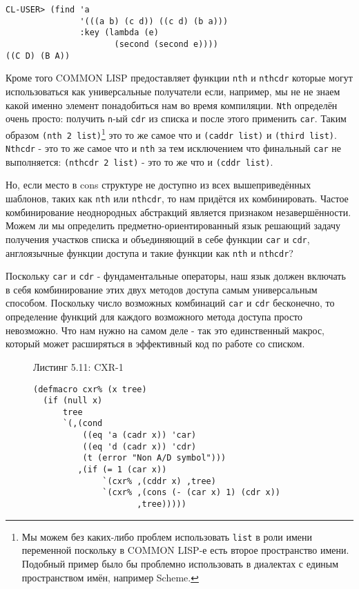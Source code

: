 \begin{verbatim}
CL-USER> (find 'a
               '(((a b) (c d)) ((c d) (b a)))
               :key (lambda (e)
                      (second (second e))))
((C D) (B A))
\end{verbatim}

Кроме того COMMON LISP предоставляет функции \verb"nth" и \verb"nthcdr" которые могут использоваться как универсальные получатели если, например, мы не не знаем какой именно элемент понадобиться нам во время компиляции. \verb"Nth" определён очень просто: получить \verb"n"-ый \verb"cdr" из списка и после этого применить \verb"car". Таким образом \verb"(nth 2 list)"\footnote{Мы можем без каких-либо проблем использовать \verb"list" в роли имени переменной поскольку в COMMON LISP-е есть второе пространство имени. Подобный пример было бы проблемно использовать в диалектах с единым пространством имён, например Scheme.} это то же самое что и \verb"(caddr list)" и \verb"(third list)". \verb"Nthcdr" - это то же самое что и \verb"nth" за тем исключением что финальный \verb"car" не выполняется: \verb"(nthcdr 2 list)" - это то же что и \verb"(cddr list)".



Но, если место в cons структуре не доступно из всех вышеприведённых шаблонов, таких как \verb"nth" или \verb"nthcdr", то нам придётся их комбинировать. Частое комбинирование неоднородных абстракций является признаком незавершённости. Можем ли мы определить предметно-ориентированный язык решающий задачу получения участков списка и объединяющий в себе функции \verb"car" и \verb"cdr", англоязычные функции доступа и такие функции как \verb"nth" и \verb"nthcdr"?

Поскольку \verb"car" и \verb"cdr" - фундаментальные операторы, наш язык должен включать в себя комбинирование этих двух методов доступа самым универсальным способом. Поскольку число возможных комбинаций \verb"car" и \verb"cdr" бесконечно, то определение функций для каждого возможного метода доступа просто невозможно. Что нам нужно на самом деле - так это единственный макрос, который может расширяться в эффективный код по работе со списком.

\begin{figure}Листинг 5.11: CXR-1\label{listing_5.11}
\listbegin
\begin{verbatim}
(defmacro cxr% (x tree)
  (if (null x)
      tree
      `(,(cond
          ((eq 'a (cadr x)) 'car)
          ((eq 'd (cadr x)) 'cdr)
          (t (error "Non A/D symbol")))
         ,(if (= 1 (car x))
              `(cxr% ,(cddr x) ,tree)
              `(cxr% ,(cons (- (car x) 1) (cdr x))
                     ,tree)))))
\end{verbatim}
\listend
\end{figure}

